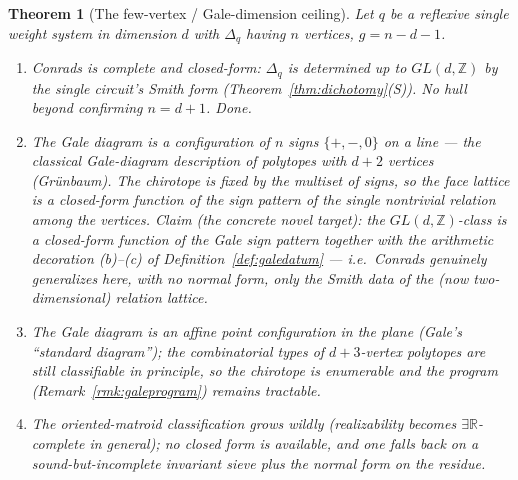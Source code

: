 \documentclass{amsart}
\newtheorem{theorem}{Theorem}[section]
\begin{document}
\begin{theorem}[The few-vertex / Gale-dimension ceiling]\label{thm:ceiling}
Let $q$ be a reflexive single weight system in dimension $d$ with
$\Delta_q$ having $n$ vertices, $g=n-d-1$.
\begin{enumerate}
  \item[$g=0$ \textnormal{($n=d{+}1$, simplices):}] Conrads is \emph{complete and
        closed-form}: $\Delta_q$ is determined up to $GL(d,\mathbb Z)$ by the
        single circuit's Smith form (Theorem~\ref{thm:dichotomy}(S)). No hull
        beyond confirming $n=d{+}1$. \emph{Done.}
  \item[$g=1$ \textnormal{($n=d{+}2$):}] The Gale diagram is a configuration of
        $n$ signs $\{+,-,0\}$ on a line --- the classical Gale-diagram description
        of polytopes with $d{+}2$ vertices (Gr\"unbaum). The chirotope is fixed by
        the multiset of signs, so the face lattice is a closed-form function of
        the sign pattern of the single nontrivial relation among the vertices.
        \emph{Claim (the concrete novel target):} the $GL(d,\mathbb Z)$-class is a
        closed-form function of the Gale sign pattern together with the arithmetic
        decoration (b)--(c) of Definition~\ref{def:galedatum} --- i.e.\ Conrads
        \emph{genuinely generalizes} here, with no normal form, only the Smith
        data of the (now two-dimensional) relation lattice.
  \item[$g=2$ \textnormal{($n=d{+}3$):}] The Gale diagram is an \emph{affine}
        point configuration in the plane (Gale's ``standard diagram''); the
        combinatorial types of $d{+}3$-vertex polytopes are still classifiable in
        principle, so the chirotope is enumerable and the program
        (Remark~\ref{rmk:galeprogram}) remains tractable.
  \item[$g\ge3$:] The oriented-matroid classification grows wildly (realizability
        becomes $\exists\mathbb R$-complete in general); no closed form is
        available, and one falls back on a \emph{sound-but-incomplete} invariant
        sieve plus the normal form on the residue.
\end{enumerate}
\end{theorem}
\end{document}
